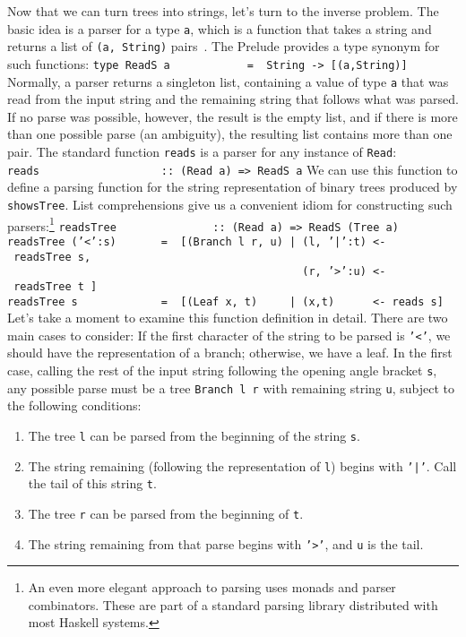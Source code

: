 Now that we can turn trees into strings, let's turn to the inverse
problem.  The basic idea is a parser for a type \mbox{\tt a}, which
is a function that takes a string and returns a list of \mbox{\tt (a,\ String)}
pairs~\cite{wadler:list-of-successes}.  The Prelude provides
a type synonym for such functions:
\bprog
\mbox{\tt type\ ReadS\ a\ \ \ \ \ \ \ \ \ \ \ \ =\ \ String\ ->\ [(a,String)]}
\eprog
Normally, a parser returns a singleton list, containing a value
of type \mbox{\tt a} that was read from the input string and the remaining
string that follows what was parsed.  If no parse was possible, however,
the result is the empty list, and if there is more than one possible
parse (an ambiguity), the resulting list contains more than one pair.
The standard function \mbox{\tt reads} is a parser for any instance of \mbox{\tt Read}:
\bprog
\mbox{\tt reads\ \ \ \ \ \ \ \ \ \ \ \ \ \ \ \ \ \ \ ::\ (Read\ a)\ =>\ ReadS\ a}
\eprog
We can use this function to define a parsing function for the string
representation of binary trees produced by \mbox{\tt showsTree}.  List comprehensions
give us a convenient idiom for constructing such parsers:\footnote{An
even more elegant approach to parsing uses monads and parser
combinators.  These are part of a standard parsing library distributed
with most Haskell systems.}
\bprog
\mbox{\tt readsTree\ \ \ \ \ \ \ \ \ \ \ \ \ \ \ ::\ (Read\ a)\ =>\ ReadS\ (Tree\ a)}\\
\mbox{\tt readsTree\ ('<':s)\ \ \ \ \ \ \ =\ \ [(Branch\ l\ r,\ u)\ |\ (l,\ '|':t)\ <-\ readsTree\ s,}\\
\mbox{\tt \ \ \ \ \ \ \ \ \ \ \ \ \ \ \ \ \ \ \ \ \ \ \ \ \ \ \ \ \ \ \ \ \ \ \ \ \ \ \ \ \ \ \ \ \ \ (r,\ '>':u)\ <-\ readsTree\ t\ ]}\\
\mbox{\tt readsTree\ s\ \ \ \ \ \ \ \ \ \ \ \ \ =\ \ [(Leaf\ x,\ t)\ \ \ \ \ |\ (x,t)\ \ \ \ \ \ <-\ reads\ s]}
\eprog
Let's take a moment to examine this function definition in detail.
There are two main cases to consider:  If the first character of the
string to be parsed is \mbox{\tt '<'}, we should have the representation of
a branch; otherwise, we have a leaf.  In the first case, calling the
rest of the input string following the opening angle bracket \mbox{\tt s},
any possible parse must be a tree \mbox{\tt Branch\ l\ r} with remaining string \mbox{\tt u},
subject to the following conditions:
\begin{enumerate}
\item
The tree \mbox{\tt l} can be parsed from the beginning of the string \mbox{\tt s}.
\item
The string remaining (following the representation of \mbox{\tt l}) begins
with \mbox{\tt '|'}.  Call the tail of this string \mbox{\tt t}.
\item
The tree \mbox{\tt r} can be parsed from the beginning of \mbox{\tt t}.
\item
The string remaining from that parse begins with \mbox{\tt '>'}, and
\mbox{\tt u} is the tail.
\end{enumerate}
